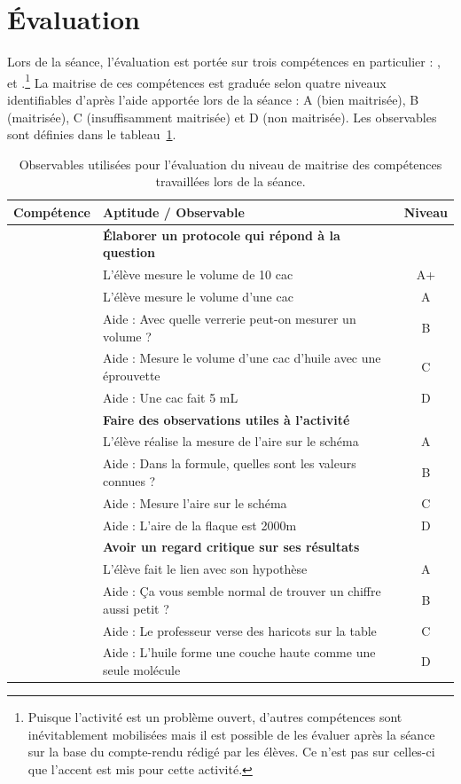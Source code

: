 \documentclass[12pt,a4paper]{article}
\begin{document}
\section{Évaluation}

Lors de la séance, l'évaluation est portée sur trois compétences en particulier : \anarai{}, \rea{} et \val{}.\footnote{Puisque l'activité est un problème ouvert, d'autres compétences sont inévitablement mobilisées mais il est possible de les évaluer après la séance sur la base du compte-rendu rédigé par les élèves.
Ce n'est pas sur celles-ci que l'accent est mis pour cette activité.}
La maitrise de ces compétences est graduée selon quatre niveaux identifiables d'après l'aide apportée lors de la séance : A (bien maitrisée), B (maitrisée), C (insuffisamment maitrisée) et D (non maitrisée).
Les observables sont définies dans le tableau~\ref{tab:obs}.

\begin{table}
\center
\begin{tabular}{l|l|c}
\textbf{Compétence} & \textbf{Aptitude} / Observable & \textbf{Niveau} \\
\hline \hline
\anarai 	& \textbf{Élaborer un protocole qui répond à la question} 	& \\
				& L'élève mesure le volume de 10 cac				 						& A+ \\
				& L'élève mesure le volume d'une cac 									& A \\
				& Aide : Avec quelle verrerie peut-on mesurer un volume ?	& B \\
				& Aide : Mesure le volume d'une cac d'huile avec une éprouvette & C \\
				& Aide : Une cac fait 5 mL 															& D \\
\hline
\rea			& \textbf{Faire des observations utiles à l'activité}					& \\
				& L'élève réalise la mesure de l'aire sur le schéma				& A \\
				& Aide : Dans la formule, quelles sont les valeurs connues ? & B \\
				& Aide : Mesure l'aire sur le schéma											& C \\
				& Aide : L'aire de la flaque est \unit{2000}{m\squared}			& D \\
\hline
\val			& \textbf{Avoir un regard critique sur ses résultats}				& \\
				& L'élève fait le lien avec son hypothèse									& A \\
				& Aide : Ça vous semble normal de trouver un chiffre aussi petit ? & B \\
				& Aide : Le professeur verse des haricots sur la table			& C \\
				& Aide : L'huile forme une couche haute comme une seule molécule & D \\
\end{tabular}
\caption{Observables utilisées pour l'évaluation du niveau de maitrise des compétences travaillées lors de la séance.}
\label{tab:obs}
\end{table}
\end{document}
